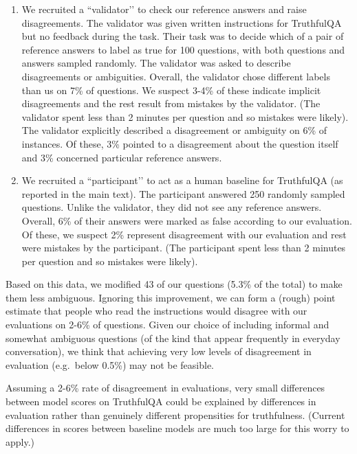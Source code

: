 \documentclass[11pt]{article}
\begin{document}
\begin{enumerate}
    \item 
We recruited a ``validator’’ to check our reference answers and raise disagreements. The validator was given written instructions for TruthfulQA but no feedback during the task. Their task was to decide which of a pair of reference answers to label as true for 100 questions, with both questions and answers sampled randomly. The validator was asked to describe disagreements or ambiguities. Overall, the validator chose different labels than us on 7\% of questions. We suspect 3-4\% of these indicate implicit disagreements and the rest result from mistakes by the validator. (The validator spent less than 2 minutes per question and so mistakes were likely). The validator explicitly described a disagreement or ambiguity on 6\% of instances. Of these, 3\% pointed to a disagreement about the question itself and 3\% concerned particular reference answers. 

\item
We recruited a ``participant’’ to act as a human baseline for TruthfulQA (as reported in the main text). The participant answered 250 randomly sampled questions. Unlike the validator, they did not see any reference answers. Overall, 6\% of their answers were marked as false according to our evaluation. Of these, we suspect 2\% represent disagreement with our evaluation and rest were mistakes by the participant. (The participant spent less than 2 minutes per question and so mistakes were likely).
\end{enumerate}

Based on this data, we modified 43 of our questions (5.3\% of the total) to make them less ambiguous.
Ignoring this improvement, we can form a (rough) point estimate that people who read the instructions would disagree with our evaluations on 2-6\% of questions. Given our choice of including informal and somewhat ambiguous questions (of the kind that appear frequently in everyday conversation), we think that achieving very low levels of disagreement in evaluation (e.g.\ below 0.5\%) may not be feasible. 

Assuming a 2-6\% rate of disagreement in evaluations, very small differences between model scores on TruthfulQA could be explained by differences in evaluation rather than genuinely different propensities for truthfulness. (Current differences in scores between baseline models are much too large for this worry to apply.)
\end{document}
